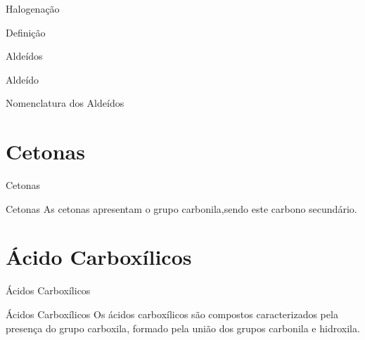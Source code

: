 \documentclass[presentation,professionalfonts,aspectratio=169]{beamer}
\begin{document}
\begin{frame}[label={sec:orgc1e6b56}]{Halogenação}
\begin{frame}[label={sec:orgc944da7}]{Definição}
\begin{frame}[label={sec:orgb40a1d4}]{Aldeídos}
\begin{mybox}{Aldeído}
   \begin{center}
\end{center}
\end{mybox}
\end{frame}


\begin{frame}[label={sec:org6207dd3}]{Nomenclatura dos Aldeídos}

\end{frame}

\section{Cetonas}
\label{sec:org7796527}

\begin{frame}[label={sec:org1b55ff4}]{Cetonas}
\begin{mybox}{Cetonas}
As cetonas apresentam o grupo carbonila,sendo este carbono secundário.
\begin{center}
\end{center}
\end{mybox}
\end{frame}


\section{Ácido Carboxílicos}
\label{sec:orgd9ee0aa}
\begin{frame}[label={sec:org7dbfcdc}]{Ácidos Carboxílicos}
\begin{mybox}{Ácidos Carboxílicos}
Os ácidos carboxílicos são compostos caracterizados pela
presença do grupo \alert{carboxila}, formado pela união dos grupos carbonila e hidroxila.


\begin{center}
\end{center}
\end{mybox}
\end{frame}



\end{frame}
\end{frame}
\end{document}
